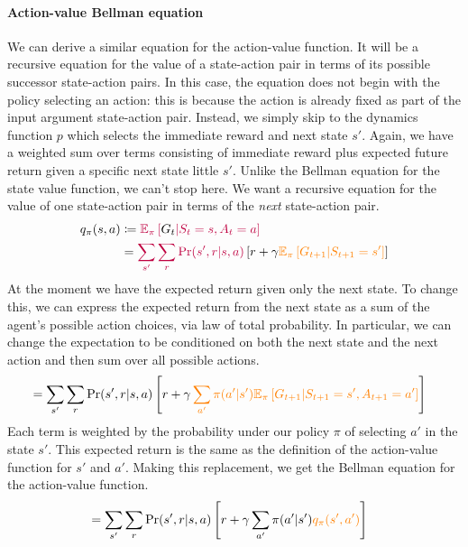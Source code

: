 \documentclass[12pt]{article}
\begin{document}
\paragraph{Action-value Bellman equation}
We can derive a similar equation for the action-value function. It will be a recursive equation for the value of a state-action pair in terms of its possible successor state-action pairs. In this case, the equation does not begin with the policy selecting an action: this is because the action is already fixed as part of the input argument state-action pair. Instead, we simply skip to the dynamics function $p$ which selects the immediate reward and next state $s'$. Again, we have a weighted sum over terms consisting of immediate reward plus expected future return given a specific next state little $s'$. Unlike the Bellman equation for the state value function, we can't stop here. We want a recursive equation for the value of one state-action pair in terms of the \emph{next} state-action pair. 
\begin{align}
  q_\pi(s,a) &\coloneqq \color{purple} \mathbb E_\pi \left[ \color{black} G_t                \color{purple} | S_t = s, A_t = a \right] \\
             &= \color{purple} \sum_{s'} \sum_{r} \Pr(s', r | s, a) \color{black} \left[r + \gamma \color{orange} \mathbb E_\pi \left[G_{t+1} | S_{t+1} = s' \right] \color{black} \right]
\end{align}
At the moment we have the expected return given only the next state. To change this, we can express the expected return from the next state as a sum of the agent's possible action choices, via law of total probability. In particular, we can change the expectation to be conditioned on both the next state and the next action and then sum over all possible actions.
\begin{align*}
  &= \sum_{s'} \sum_{r} \Pr(s', r|s,a) \left[ r + \gamma \color{orange} \sum_{a'} \pi(a'|s') \mathbb E_\pi \left[G_{t+1} | S_{t+1} = s', A_{t+1} = a' \right] \color{black} \right]
\end{align*}
Each term is weighted by the probability under our policy $\pi$ of selecting $a'$ in the state $s'$. This expected return is the same as the definition of the action-value function for $s'$ and $a'$. Making this replacement, we get the Bellman equation for the action-value function.
\begin{align*}
  &= \sum_{s'} \sum_{r} \Pr(s', r|s,a) \left[ r + \gamma \sum_{a'} \pi(a'|s')\color{orange} q_\pi(s',a') \color{black} \right]
\end{align*}
\end{document}
